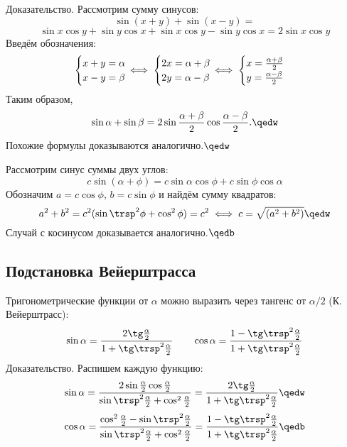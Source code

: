{\bold Доказательство.} Рассмотрим сумму синусов:
$$\sin(x+y)+\sin(x-y)=$$
$$\sin x\cos y+\sin y\cos x+\sin x\cos y-\sin y\cos x=2\sin x\cos y$$
Введём обозначения:
$$\begin{cases}
x+y=\alpha\\
x-y=\beta
\end{cases}\hspace*{-12pt}\iff
\begin{cases}
2x=\alpha+\beta\\
2y=\alpha-\beta
\end{cases}\hspace*{-12pt}\iff
\begin{cases}
x=\frac{\alpha+\beta}{2}\\
y=\frac{\alpha-\beta}{2}
\end{cases}$$
Таким образом,
$$\sin\alpha+\sin\beta=2\sin\frac{\alpha+\beta}{2}\cos\frac{\alpha-\beta}{2}.\qedw$$
Похожие формулы доказываются аналогично.$\qedw$\par

Рассмотрим синус суммы двух углов:
$$c\sin(\alpha+\phi)=c\sin\alpha\cos\phi+c\sin\phi\cos\alpha$$
Обозначим $a=c\cos\phi$, $b=c\sin\phi$ и найдём сумму квадратов:
$$a^2+b^2=c^2(\sin\trsp^2\phi+\cos^2\phi)=c^2\iff c=\sqrt{(a^2+b^2)}\qedw$$
Случай с косинусом доказывается аналогично.$\qedb$

\subsection{Подстановка Вейерштрасса}

Тригонометрические функции от $\alpha$ можно выразить через тангенс от $\alpha/2$
{\ital\color{desc}(К. Вейерштрасс)}:
$$\sin\alpha=\frac{2\tg\frac{\alpha}{2}}{1+\tg\trsp^2\frac{\alpha}{2}}\quad\quad
\cos\alpha=\frac{1-\tg\trsp^2\frac{\alpha}{2}}{1+\tg\trsp^2\frac{\alpha}{2}}$$
{\bold Доказательство.} Распишем каждую функцию:
$$\sin\alpha=\frac{2\sin\frac{\alpha}{2}\cos\frac{\alpha}{2}}{\sin\trsp^2\frac{\alpha}{2}
+\cos^2\frac{\alpha}{2}}=\frac{2\tg\frac{\alpha}{2}}{1+\tg\trsp^2\frac{\alpha}{2}}\qedw$$
$$\cos\alpha=\frac{\cos^2\frac{\alpha}{2}-\sin\trsp^2\frac{\alpha}{2}}{\sin\trsp^2\frac
{\alpha}{2}+\cos^2\frac{\alpha}{2}}=\frac{1-\tg\trsp^2\frac{\alpha}{2}}{1+\tg\trsp^2\frac
{\alpha}{2}}\qedb$$
